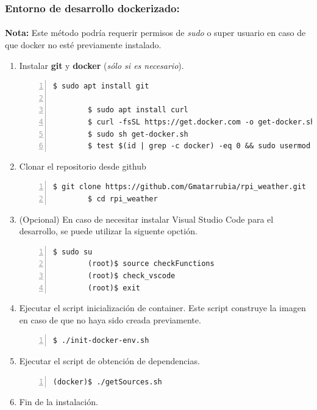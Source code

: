 \subsubsection{Entorno de desarrollo dockerizado:}

\paragraph{}\textbf{Nota:} Este método podría requerir permisos de \emph{sudo} o super
usuario en caso de que docker no esté previamente instalado.

\begin{enumerate}
    \item Instalar \textbf{\gls{git}} y \textbf{docker} (\emph{sólo si es necesario}).
    \begin{lstlisting}[style=consola, numbers=left]
        $ sudo apt install git

        $ sudo apt install curl
        $ curl -fsSL https://get.docker.com -o get-docker.sh
        $ sudo sh get-docker.sh
        $ test $(id | grep -c docker) -eq 0 && sudo usermod -aG docker $(whoami)
    \end{lstlisting}

    \item Clonar el repositorio desde github
    \begin{lstlisting}[style=consola, numbers=left]
        $ git clone https://github.com/Gmatarrubia/rpi_weather.git
        $ cd rpi_weather
    \end{lstlisting}

    \item (Opcional) En caso de necesitar instalar Visual Studio Code para el desarrollo,
    se puede utilizar la siguente opctión.
    \begin{lstlisting}[style=consola, numbers=left]
        $ sudo su
        (root)$ source checkFunctions
        (root)$ check_vscode
        (root)$ exit
    \end{lstlisting}

    \item Ejecutar el script inicialización de container. Este script construye la
    imagen en caso de que no haya sido creada previamente.
    \begin{lstlisting}[style=consola, numbers=left]
        $ ./init-docker-env.sh
    \end{lstlisting}

    \item Ejecutar el script de obtención de dependencias.
    \begin{lstlisting}[style=consola, numbers=left]
        (docker)$ ./getSources.sh
    \end{lstlisting}

    \item Fin de la instalación.
\end{enumerate}

